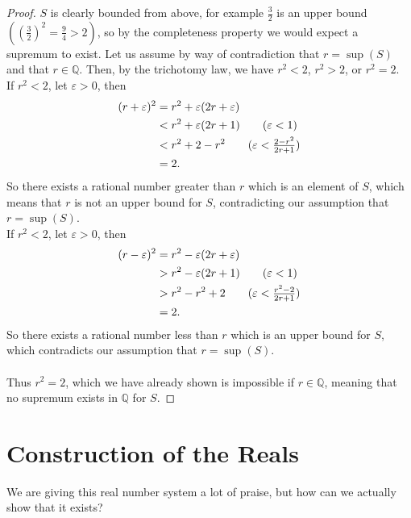 \documentclass[../real_analysis.tex]{subfiles}
\begin{document}
        \begin{proof}
            $S$ is clearly bounded from above, for example $\frac{3}{2}$ is an upper bound $\left(\left(\frac{3}{2}\right)^2 = \frac{9}{4} > 2\right)$, so by the completeness property we would expect a supremum to exist. Let us assume by way of contradiction that $r=\sup(S)$ and that $r\in\mathbb{Q}$.
            Then, by the trichotomy law, we have $r^2<2$, $r^2>2$, or $r^2=2$.\\
            If $r^2<2$, let $\varepsilon>0$, then
            \begin{align}
                (r+\varepsilon)^2 &= r^2+\varepsilon(2r+\varepsilon)\\
                &< r^2+\varepsilon(2r+1)\tag{$\varepsilon<1$}\\
                &< r^2+2-r^2\tag{$\varepsilon<\frac{2-r^2}{2r+1}$}\\
                &= 2.
            \end{align}
            So there exists a rational number greater than $r$ which is an element of $S$, which means that $r$ is not an upper bound for $S$, contradicting our assumption that $r=\sup(S)$.\\
            If $r^2<2$, let $\varepsilon>0$, then
            \begin{align}
                (r-\varepsilon)^2 &= r^2-\varepsilon(2r+\varepsilon)\\
                &> r^2-\varepsilon(2r+1)\tag{$\varepsilon<1$}\\
                &> r^2-r^2+2\tag{$\varepsilon<\frac{r^2-2}{2r+1}$}\\
                &= 2.
            \end{align}
            So there exists a rational number less than $r$ which is an upper bound for $S$, which contradicts our assumption that $r=\sup(S)$.\\\\
            Thus $r^2=2$, which we have already shown is impossible if $r\in\mathbb{Q}$, meaning that no supremum exists in $\mathbb{Q}$ for $S$.
        \end{proof}

    \section{Construction of the Reals}
        We are giving this real number system a lot of praise, but how can we actually show that it exists?
\end{document}

